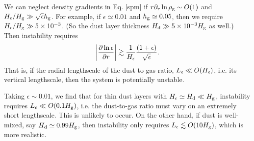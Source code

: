 We can neglect density gradients in Eq. \ref{spm} 
if $r\partial_r\ln{\rho_\mathrm{g}}\sim O(1)$ and $H_\epsilon/H_\mathrm{g}\gg
\sqrt{\epsilon}h_\mathrm{g}$. For example, if $\epsilon\simeq 0.01$ and
$h_\mathrm{g}\simeq 0.05$, then we require $H_\epsilon/H_\mathrm{g}\gg
5\times10^{-3}$. (So the dust layer thickness $H_\mathrm{d}\gg 5
\times10^{-3}H_\mathrm{g}$ as well.) Then 
instability requires 
\begin{align}\label{dust_edge}
\left|\frac{\partial\ln{\epsilon}}{\partial r}\right| \gtrsim
  \frac{1}{H_\epsilon}\frac{\left(1+\epsilon\right)}{\sqrt{\epsilon}}.
\end{align}
That is, if the radial lengthscale of the dust-to-gas ratio,
$L_\epsilon\ll O(H_\epsilon)$, i.e. its vertical lengthscale,  
then the system is potentially unstable.  

Taking $\epsilon\sim 0.01$,  we find that 
for thin dust layers with $H_\epsilon \simeq H_\mathrm{d}\ll H_\mathrm{g}$,  instability
requires $L_\epsilon\ll O(0.1H_\mathrm{g})$, i.e. the dust-to-gas ratio must
vary on an extremely short lengthscale. 
This is unlikely to
occur. On the other hand, if dust is well-mixed, say $H_\mathrm{d}\simeq
0.99H_\mathrm{g}$, then instability only requires 
$L_\epsilon\lesssim O(10H_\mathrm{g})$, which is more realistic. 


